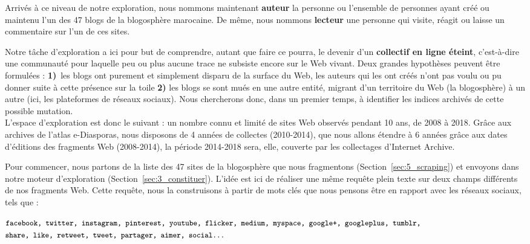 \documentclass[symmetric,justified,marginals=raggedouter]{tufte-book}
\begin{document}
\noindent Arrivés à ce niveau de notre exploration, nous nommons maintenant \textbf{auteur} la personne ou l'ensemble de personnes ayant créé ou maintenu l'un des 47 blogs de la blogosphère marocaine. De même, nous nommons \textbf{lecteur} une personne qui visite, réagit ou laisse un commentaire sur l'un de ces sites.

Notre tâche d'exploration a ici pour but de comprendre, autant que faire ce pourra, le devenir d'un \textbf{collectif en ligne éteint}, c'est-à-dire une communauté pour laquelle peu ou plus aucune trace ne subsiste encore sur le Web vivant. Deux grandes hypothèses peuvent être formulées : \textbf{1)}~les blogs ont purement et simplement disparu de la surface du Web, les auteurs qui les ont créés n'ont pas voulu ou pu donner suite à cette présence sur la toile \textbf{2)} les blogs se sont mués en une autre entité, migrant d'un territoire du Web (la blogosphère) à un autre (ici, les plateformes de réseaux sociaux). Nous chercherons donc, dans un premier temps, à identifier les indices archivés de cette possible mutation. \\

\noindent L'espace d'exploration est donc le suivant : un nombre connu et limité de sites Web observés pendant 10 ans, de 2008 à 2018. Grâce aux archives de l'atlas e-Diasporas, nous disposons de 4 années de collectes (2010-2014), que nous allons étendre à 6 années grâce aux dates d'éditions des fragments Web (2008-2014), la période 2014-2018 sera, elle, couverte par les collectages d'Internet Archive. 

Pour commencer, nous partons de la liste des 47 sites de la blogosphère que nous fragmentons (Section~\ref{sec:5_scraping}) et envoyons dans notre moteur d'exploration (Section~\ref{sec:3_constituer}). L'idée est ici de réaliser une même requête plein texte sur deux champs différents de nos fragments Web. Cette requête, nous la construisons à partir de mots clés que nous pensons être en rapport avec les réseaux sociaux, tels que :\\

\begin{fullwidth}
$\small\texttt{facebook, twitter, instagram, pinterest, youtube, flicker, medium, myspace, google+, googleplus, tumblr,}$\\
$\small\texttt{share, like, retweet, tweet, partager, aimer, social\ldots{}}$\\
\end{fullwidth}
\end{document}
